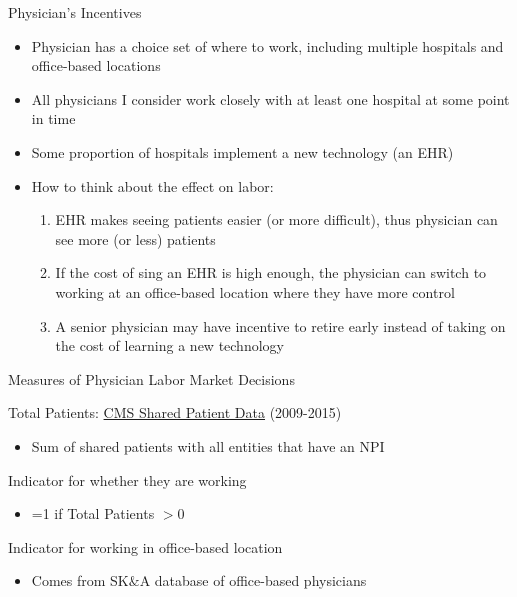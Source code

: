 \documentclass[10pt]{beamer}
\begin{document}
\begin{frame}{Physician's Incentives}
\begin{itemize}
    \item Physician has a choice set of where to work, including multiple hospitals and office-based locations
    \item All physicians I consider work closely with at least one hospital at some point in time
    \item Some proportion of hospitals implement a new technology (an EHR)
    \item How to think about the effect on labor:
    \begin{enumerate}
        \item EHR makes seeing patients easier (or more difficult), thus physician can see more (or less) patients
        \item If the cost of sing an EHR is high enough, the physician can switch to working at an office-based location where they have more control
        \item A senior physician may have incentive to retire early instead of taking on the cost of learning a new technology
    \end{enumerate}
\end{itemize}
\end{frame}


\begin{frame}{Measures of Physician Labor Market Decisions}


     Total Patients: \underline{CMS Shared Patient Data} (2009-2015)
    \begin{itemize}
        \item Sum of shared patients with all entities that have an NPI
    \end{itemize}
    
     Indicator for whether they are working
    \begin{itemize}
        \item =1 if Total Patients $>0$
    \end{itemize}
    
     Indicator for working in office-based location
    \begin{itemize}
        \item Comes from SK$\&$A database of office-based physicians
    \end{itemize}

\end{frame}
\end{document}
